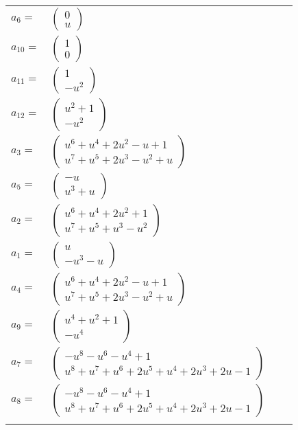 \documentclass[1p]{elsarticle_modified}
\theoremstyle{definition}
\begin{document}
\begin{tabular}{m{7pt} m{180pt} m{7pt} m{180pt} }
\flushright $a_{6}=$&$\begin{pmatrix}0\\u\end{pmatrix}$ \\
\flushright $a_{10}=$&$\begin{pmatrix}1\\0\end{pmatrix}$ \\
\flushright $a_{11}=$&$\begin{pmatrix}1\\- u^2\end{pmatrix}$ \\
\flushright $a_{12}=$&$\begin{pmatrix}u^2+1\\- u^2\end{pmatrix}$ \\
\flushright $a_{3}=$&$\begin{pmatrix}u^6+u^4+2 u^2- u+1\\u^7+u^5+2 u^3- u^2+u\end{pmatrix}$ \\
\flushright $a_{5}=$&$\begin{pmatrix}- u\\u^3+u\end{pmatrix}$ \\
\flushright $a_{2}=$&$\begin{pmatrix}u^6+u^4+2 u^2+1\\u^7+u^5+u^3- u^2\end{pmatrix}$ \\
\flushright $a_{1}=$&$\begin{pmatrix}u\\- u^3- u\end{pmatrix}$ \\
\flushright $a_{4}=$&$\begin{pmatrix}u^6+u^4+2 u^2- u+1\\u^7+u^5+2 u^3- u^2+u\end{pmatrix}$ \\
\flushright $a_{9}=$&$\begin{pmatrix}u^4+u^2+1\\- u^4\end{pmatrix}$ \\
\flushright $a_{7}=$&$\begin{pmatrix}- u^8- u^6- u^4+1\\u^8+u^7+u^6+2 u^5+u^4+2 u^3+2 u-1\end{pmatrix}$ \\
\flushright $a_{8}=$&$\begin{pmatrix}- u^8- u^6- u^4+1\\u^8+u^7+u^6+2 u^5+u^4+2 u^3+2 u-1\end{pmatrix}$\\&\end{tabular}
\end{document}
